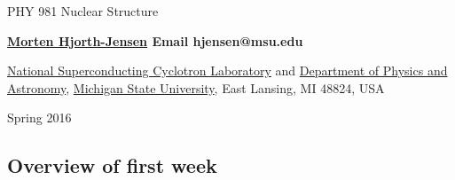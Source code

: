 \documentclass[%
oneside,                 %
final,                   %
10pt]{article}
\begin{document}






\thispagestyle{empty}

\begin{center}
{\LARGE\bf
\begin{spacing}{1.25}
PHY 981 Nuclear Structure
\end{spacing}
}
\end{center}


\begin{center}
{\bf \href{{https://github.com/mhjgit}}{Morten Hjorth-Jensen}  Email hjensen@msu.edu}
\end{center}

    \begin{center}
\centerline{{\small \href{{http://www.nscl.msu.edu/}}{National Superconducting Cyclotron Laboratory} and \href{{https://www.pa.msu.edu/}}{Department of Physics and Astronomy}, \href{{http://www.msu.edu/}}{Michigan State University}, East Lansing, MI 48824, USA}}
\end{center}
    

\begin{center}
Spring 2016 
\end{center}

\vspace{1cm}


\subsection*{Overview of first week}

\paragraph{}
\end{document}
